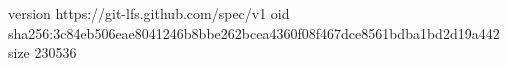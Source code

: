 version https://git-lfs.github.com/spec/v1
oid sha256:3c84eb506eae8041246b8bbe262bcea4360f08f467dce8561bdba1bd2d19a442
size 230536
